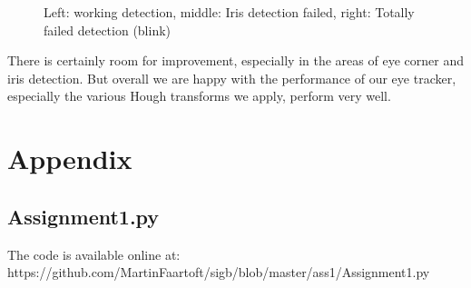 \documentclass[a4paper,11pt]{article}
\begin{document}
\begin{figure}[H]
  \caption{Left: working detection, middle: Iris detection failed, right: Totally failed detection (blink)}
  \label{fig:results}
\end{figure}

There is certainly room for improvement, especially in the areas of eye corner and iris detection. But overall we are happy with the performance of our eye tracker, especially the various Hough transforms we apply, perform very well.
\newpage

\section*{Appendix}
\subsection{Assignment1.py}
The code is available online at:\\ https://github.com/MartinFaartoft/sigb/blob/master/ass1/Assignment1.py

\end{document}
